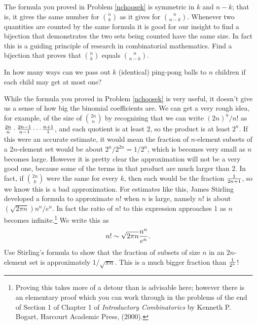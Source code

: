 \iteme The formula you proved in Problem \ref{nchoosek} is symmetric in $k$
and $n-k$; that is, it gives the same number for $n\choose k$ as it gives
for $n\choose n-k$.  Whenever two quantities are counted by the same formula
it is good for our insight to find a bijection that demonstrates the two sets
being counted have the same size.  In fact this is a guiding principle of
research in combinatorial mathematics.  Find a bijection that proves that
$n\choose k$ equals $n\choose n-k$.

\iteme In how many ways can we pass out $k$ (identical) ping-pong balls to $n$
children if each child may get at most one?\label{ping-pong}

\itemi While the formula you proved in Problem \ref{nchoosek} is very useful,
it doesn't give us a sense of how big the binomial coefficients are.  We can
get a very rough idea, for example, of the size of $2n\choose n$ by
recognizing that we can write $(2n)^{\underline{n}}/n!$ as ${2n\over n}\cdot
{2n-1\over n-1}\cdots {n+1\over 1}$, and each quotient is at least $2$, so the
product is at least $2^n$.  If this were an accurate estimate, it would mean
the fraction of $n$-element subsets of a $2n$-element set would be
about
$2^n/2^{2n}=1/2^n$, which is becomes very small as $n$ becomes large. 
However it is pretty clear the approximation will not be a very good one,
because some of the terms in that product are much larger than 2.  In fact,
if $2n\choose k$ were the same for every $k$, then each would be the fraction
$1\over 2n+1$, so we know this is a bad approximation.  For estimates like
this, James Stirling developed a formula to approximate
$n!$  when $n$ is large, namely $n!$ is about $ \left(\sqrt{2\pi
n}\right){n^n/ e^n}$.  In fact the ratio of
$n!$ to this expression approaches 1 as
$n$ becomes infinite.\footnote{Proving this takes more of a detour than is
advisable here; however there is an elementary proof which you can work
through in the problems of the end of Section 1 of Chapter 1 of {\em
Introductory Combinatorics} by Kenneth P. Bogart, Harcourt Academic Press,
(2000).}  We write this as $$n!\sim \sqrt{2\pi
n}{n^n\over e^n}.$$  Use Stirling's formula to show that the fraction of 
subsets of size
$n$ in an
$2n$-element set is approximately $1/\sqrt{\pi n}$.  This is a much bigger
fraction than $1\over 2^n$!\label{Stirling'sapproximation}



